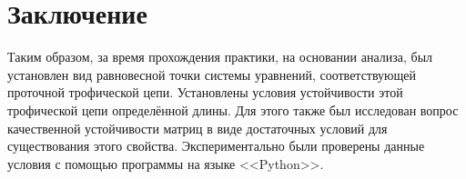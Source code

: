 \section{Заключение}
    Таким образом, за время прохождения практики, на основании анализа, был установлен вид равновесной точки системы уравнений, соответствующей проточной трофической цепи. Установлены условия устойчивости этой трофической цепи определённой длины. Для этого также был исследован вопрос качественной устойчивости матриц в виде достаточных условий для существования этого свойства. Экспериментально были проверены данные условия с помощью программы на языке <<Python>>.

